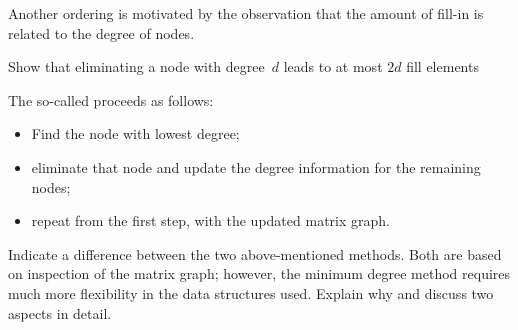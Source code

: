 Another ordering is motivated by the observation that the amount of
fill-in is related to the degree of nodes.
\begin{exercise}
  Show that eliminating a node with degree~$d$ leads to at most $2d$
  fill elements
\end{exercise}
The so-called  proceeds as follows:
\begin{itemize}
\item Find the node with lowest degree;
\item eliminate that node and update the degree information for the
  remaining nodes;
\item repeat from the first step, with the updated matrix graph.
\end{itemize}

\begin{exercise}
  Indicate a difference between the two above-mentioned methods. Both
  are based on inspection of the matrix graph; however, the minimum
  degree method requires much more flexibility in the data structures
  used. Explain why and discuss two aspects in detail.
\end{exercise}

